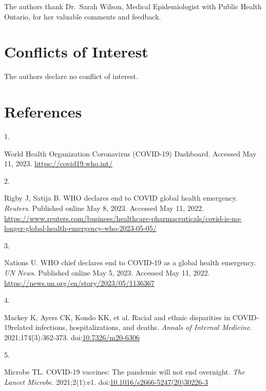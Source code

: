 \documentclass[
]{article}
\newlength{\cslhangindent}
\newlength{\csllabelwidth}
\newlength{\cslentryspacingunit} %
\newenvironment{CSLReferences}[2] %
 {%
  \setlength{\parindent}{0pt}
  \ifodd #1
  \let\oldpar\par
  \def\par{\hangindent=\cslhangindent\oldpar}
  \fi
  \setlength{\parskip}{#2\cslentryspacingunit}
 }%
 {}
\newcommand{\CSLLeftMargin}[1]{\parbox[t]{\csllabelwidth}{#1}}
\newcommand{\CSLRightInline}[1]{\parbox[t]{\linewidth - \csllabelwidth}{#1}\break}
\begin{document}
The authors thank Dr.~Sarah Wilson, Medical Epidemiologist with Public
Health Ontario, for her valuable comments and feedback.

\hypertarget{conflicts-of-interest}{%
\section{Conflicts of Interest}\label{conflicts-of-interest}}

The authors declare no conflict of interest.

\hypertarget{references}{%
\section{References}\label{references}}

\hypertarget{refs}{}
\begin{CSLReferences}{0}{0}
\leavevmode{}%
\CSLLeftMargin{1. }%
\CSLRightInline{{World Health Organization Coronavirus (COVID-19)
Dashboard}. Accessed May 11, 2023. \url{https://covid19.who.int/}}

\leavevmode{}%
\CSLLeftMargin{2. }%
\CSLRightInline{Rigby J, Satija B. {WHO} declares end to COVID global
health emergency. \emph{Reuters}. Published online May 8, 2023. Accessed
May 11, 2022.
\url{https://www.reuters.com/business/healthcare-pharmaceuticals/covid-is-no-longer-global-health-emergency-who-2023-05-05/}}

\leavevmode{}%
\CSLLeftMargin{3. }%
\CSLRightInline{Nations U. {WHO} chief declares end to COVID-19 as a
global health emergency. \emph{UN News}. Published online May 5, 2023.
Accessed May 11, 2022.
\url{https://news.un.org/en/story/2023/05/1136367}}

\leavevmode{}%
\CSLLeftMargin{4. }%
\CSLRightInline{Mackey K, Ayers CK, Kondo KK, et al. Racial and ethnic
disparities in {COVID}-19{\textendash}related infections,
hospitalizations, and deaths. \emph{Annals of Internal Medicine}.
2021;174(3):362-373.
doi:\href{https://doi.org/10.7326/m20-6306}{10.7326/m20-6306}}

\leavevmode{}%
\CSLLeftMargin{5. }%
\CSLRightInline{Microbe TL. {COVID}-19 vaccines: The pandemic will not
end overnight. \emph{The Lancet Microbe}. 2021;2(1):e1.
doi:\href{https://doi.org/10.1016/s2666-5247(20)30226-3}{10.1016/s2666-5247(20)30226-3}}


\end{CSLReferences}
\end{document}
